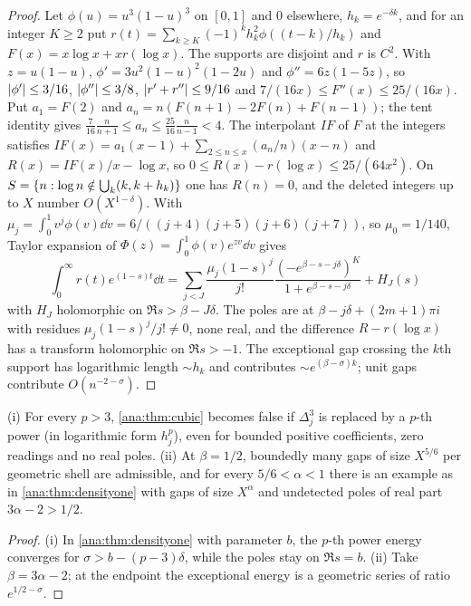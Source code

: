 \begin{proof}
Let $\phi(u)=u^3(1-u)^3$ on $[0,1]$ and $0$ elsewhere, $h_k=e^{-\delta k}$, and for an integer
$K\ge2$ put $r(t)=\sum_{k\ge K}(-1)^kh_k^2\phi((t-k)/h_k)$ and $F(x)=x\log x+xr(\log x)$. The
supports are disjoint and $r$ is $C^2$. With $z=u(1-u)$, $\phi'=3u^2(1-u)^2(1-2u)$ and
$\phi''=6z(1-5z)$, so $\lvert\phi'\rvert\le3/16$, $\lvert\phi''\rvert\le3/8$, $\lvert r'+r''\rvert\le9/16$ and
$7/(16x)\le F''(x)\le25/(16x)$. Put $a_1=F(2)$ and $a_n=n(F(n+1)-2F(n)+F(n-1))$; the tent
identity gives $\frac7{16}\frac n{n+1}\le a_n\le\frac{25}{16}\frac n{n-1}<4$. The interpolant
$IF$ of $F$ at the integers satisfies $IF(x)=a_1(x-1)+\sum_{2\le n\le x}(a_n/n)(x-n)$ and
$R(x)=IF(x)/x-\log x$, so $0\le R(x)-r(\log x)\le25/(64x^2)$. On
$S=\{n:\log n\notin\bigcup_k(k,k+h_k)\}$ one has $R(n)=0$, and the deleted integers up to $X$
number $O(X^{1-\delta})$. With $\mu_j=\int_0^1v^j\phi(v)\dd v=6/((j+4)(j+5)(j+6)(j+7))$, so
$\mu_0=1/140$, Taylor expansion of $\Phi(z)=\int_0^1\phi(v)e^{zv}\dd v$ gives
\[
 \int_0^\infty r(t)e^{(1-s)t}\dd t=\sum_{j<J}\frac{\mu_j(1-s)^j}{j!}
 \frac{(-e^{\beta-s-j\delta})^K}{1+e^{\beta-s-j\delta}}+H_J(s)
\]
with $H_J$ holomorphic on $\Re s>\beta-J\delta$. The poles are at
$\beta-j\delta+(2m+1)\pi i$ with residues $\mu_j(1-s)^j/j!\ne0$, none real, and the difference
$R-r(\log x)$ has a transform holomorphic on $\Re s>-1$. The exceptional gap crossing the $k$th
support has logarithmic length $\sim h_k$ and contributes $\sim e^{(\beta-\sigma)k}$; unit gaps
contribute $O(n^{-2-\sigma})$.
\end{proof}

\begin{corollary}\label{ana:cor:cubicsharp}
(i) For every $p>3$, \cref{ana:thm:cubic} becomes false if $\Delta_j^3$ is replaced by a
$p$-th power (in logarithmic form $h_j^p$), even for bounded positive coefficients, zero
readings and no real poles. (ii) At $\beta=1/2$, boundedly many gaps of size $X^{5/6}$ per
geometric shell are admissible, and for every $5/6<\alpha<1$ there is an example as in
\cref{ana:thm:densityone} with gaps of size $X^\alpha$ and undetected poles of real part
$3\alpha-2>1/2$.
\end{corollary}

\begin{proof}
(i) In \cref{ana:thm:densityone} with parameter $b$, the $p$-th power energy converges for
$\sigma>b-(p-3)\delta$, while the poles stay on $\Re s=b$. (ii) Take $\beta=3\alpha-2$; at the
endpoint the exceptional energy is a geometric series of ratio $e^{1/2-\sigma}$.
\end{proof}

